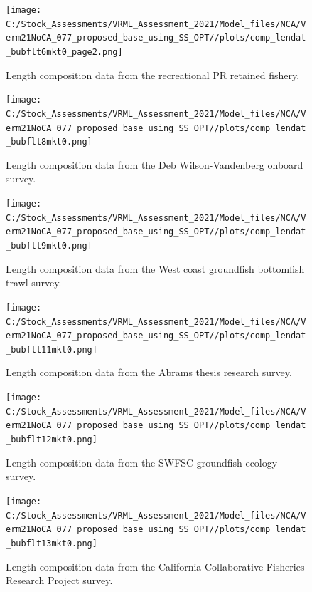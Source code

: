 \documentclass[
  english,
  a4paper,
]{article}
\begin{document}
\begin{figure}
\centering
\texttt{[image: C:/Stock\_Assessments/VRML\_Assessment\_2021/Model\_files/NCA/Verm21NoCA\_077\_proposed\_base\_using\_SS\_OPT//plots/comp\_lendat\_bubflt6mkt0\_page2.png]}
\caption{Length composition data from the recreational PR retained fishery.\label{fig:len-data-REC-PR}}
\end{figure}

\begin{figure}
\centering
\texttt{[image: C:/Stock\_Assessments/VRML\_Assessment\_2021/Model\_files/NCA/Verm21NoCA\_077\_proposed\_base\_using\_SS\_OPT//plots/comp\_lendat\_bubflt8mkt0.png]}
\caption{Length composition data from the Deb Wilson-Vandenberg onboard survey.\label{fig:len-data-DWV-ONBOARD}}
\end{figure}

\begin{figure}
\centering
\texttt{[image: C:/Stock\_Assessments/VRML\_Assessment\_2021/Model\_files/NCA/Verm21NoCA\_077\_proposed\_base\_using\_SS\_OPT//plots/comp\_lendat\_bubflt9mkt0.png]}
\caption{Length composition data from the West coast groundfish bottomfish trawl survey.\label{fig:len-data-NWFSC-TWL}}
\end{figure}

\begin{figure}
\centering
\texttt{[image: C:/Stock\_Assessments/VRML\_Assessment\_2021/Model\_files/NCA/Verm21NoCA\_077\_proposed\_base\_using\_SS\_OPT//plots/comp\_lendat\_bubflt11mkt0.png]}
\caption{Length composition data from the Abrams thesis research survey.\label{fig:len-data-ABRAMS-RESEARCH}}
\end{figure}

\begin{figure}
\centering
\texttt{[image: C:/Stock\_Assessments/VRML\_Assessment\_2021/Model\_files/NCA/Verm21NoCA\_077\_proposed\_base\_using\_SS\_OPT//plots/comp\_lendat\_bubflt12mkt0.png]}
\caption{Length composition data from the SWFSC groundfish ecology survey.\label{fig:len-data-SWFSC-GF-ECOL}}
\end{figure}

\begin{figure}
\centering
\texttt{[image: C:/Stock\_Assessments/VRML\_Assessment\_2021/Model\_files/NCA/Verm21NoCA\_077\_proposed\_base\_using\_SS\_OPT//plots/comp\_lendat\_bubflt13mkt0.png]}
\caption{Length composition data from the California Collaborative Fisheries Research Project survey.\label{fig:len-data-CCFRP}}
\end{figure}
\end{document}
